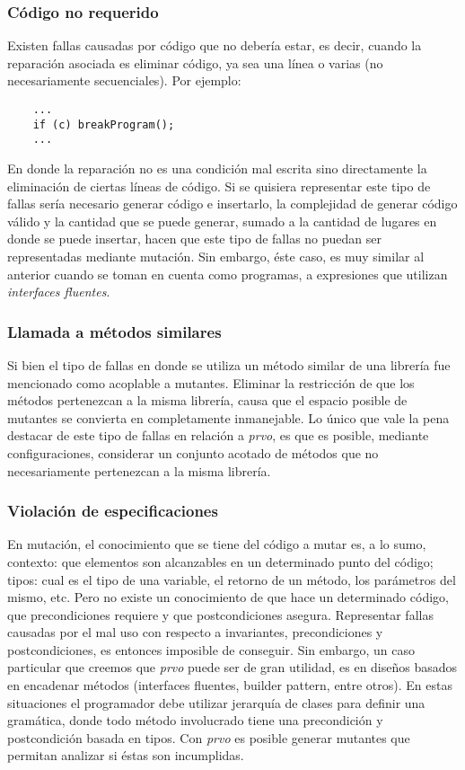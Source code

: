 \subsubsection{C\'odigo no requerido} %

Existen fallas causadas por c\'odigo que no deber\'ia estar, es decir, cuando la reparaci\'on asociada es eliminar c\'odigo, ya sea una l\'inea o varias (no necesariamente secuenciales). Por ejemplo:
\begin{lstlisting}
	...
	if (c) breakProgram();
	...
\end{lstlisting}
En donde la reparaci\'on no es una condici\'on mal escrita sino directamente la eliminaci\'on de ciertas l\'ineas de c\'odigo. Si se quisiera representar este tipo de fallas ser\'ia necesario generar c\'odigo e insertarlo, la complejidad de generar c\'odigo v\'alido y la cantidad que se puede generar, sumado a la cantidad de lugares en donde se puede insertar, hacen que este tipo de fallas no puedan ser representadas mediante mutaci\'on. Sin embargo, \'este caso, es muy similar al anterior cuando se toman en cuenta como programas, a expresiones que utilizan \emph{interfaces fluentes}.

\subsubsection{Llamada a m\'etodos similares}

Si bien el tipo de fallas en donde se utiliza un m\'etodo similar de una librer\'ia fue mencionado como acoplable a mutantes. Eliminar la restricci\'on de que los m\'etodos pertenezcan a la misma librer\'ia, causa que el espacio posible de mutantes se convierta en completamente inmanejable. Lo \'unico que vale la pena destacar de este tipo de fallas en relaci\'on a \emph{prvo}, es que es posible, mediante configuraciones, considerar un conjunto acotado de m\'etodos que no necesariamente pertenezcan a la misma librer\'ia.

\subsubsection{Violaci\'on de especificaciones}

En mutaci\'on, el conocimiento que se tiene del c\'odigo a mutar es, a lo sumo, contexto: que elementos son alcanzables en un determinado punto del c\'odigo; tipos: cual es el tipo de una variable, el retorno de un m\'etodo, los par\'ametros del mismo, etc. Pero no existe un conocimiento de que hace un determinado c\'odigo, que precondiciones requiere y que postcondiciones asegura. Representar fallas causadas por el mal uso con respecto a invariantes, precondiciones y postcondiciones, es entonces imposible de conseguir. Sin embargo, un caso particular que creemos que \emph{prvo} puede ser de gran utilidad, es en dise\~nos basados en encadenar m\'etodos (interfaces fluentes, builder pattern, entre otros). En estas situaciones el programador debe utilizar jerarqu\'ia de clases para definir una gram\'atica, donde todo m\'etodo involucrado tiene una precondici\'on y postcondici\'on basada en tipos. Con \emph{prvo} es posible generar mutantes que permitan analizar si \'estas son incumplidas.

